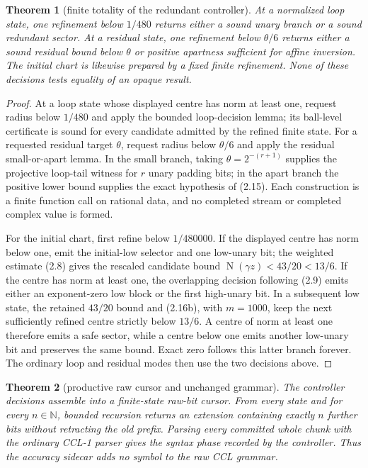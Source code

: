 \documentclass[10pt]{article}
\newtheorem{theorem}{Theorem}[section]
\theoremstyle{definition}
\theoremstyle{remark}
\newcommand{\N}{\mathbb{N}}
\newcommand{\Norm}{\operatorname{N}}
\begin{document}
\begin{theorem}[finite totality of the redundant controller]
At a normalized loop state, one refinement below $1/480$ returns either a
sound unary branch or a sound redundant sector.  At a residual state, one
refinement below $\theta/6$ returns either a sound residual bound below
$\theta$ or positive apartness sufficient for affine inversion.  The initial
chart is likewise prepared by a fixed finite refinement.  None of these
decisions tests equality of an opaque result.
\end{theorem}

\begin{proof}
At a loop state whose displayed centre has norm at least one, request radius
below $1/480$ and apply the bounded loop-decision lemma; its ball-level
certificate is sound for every candidate admitted by the refined finite
state.  For a requested residual target $\theta$, request radius below
$\theta/6$ and apply the residual small-or-apart lemma.  In the
small branch, taking $\theta=2^{-(r+1)}$ supplies the projective loop-tail
witness for $r$ unary padding bits; in the apart branch the positive lower
bound supplies the exact hypothesis of (2.15).  Each construction is a
finite function call on rational data, and no completed stream or completed
complex value is formed.

For the initial chart, first refine below $1/480000$.  If the displayed centre
has norm below one, emit the initial-low selector and one low-unary bit; the
weighted estimate (2.8) gives the rescaled candidate bound
$\Norm(\gamma z)<43/20<13/6$.  If the centre has norm at least one, the
overlapping decision following (2.9) emits either an exponent-zero low block
or the first high-unary bit.  In a subsequent low state, the retained
$43/20$ bound and (2.16b), with $m=1000$, keep the next sufficiently refined
centre strictly below $13/6$.  A centre of norm at least one therefore emits
a safe sector, while a centre below one emits another low-unary bit and
preserves the same bound.  Exact zero follows this latter branch forever.
The ordinary loop and residual modes then use the two decisions above.
\end{proof}

\begin{theorem}[productive raw cursor and unchanged grammar]
The controller decisions assemble into a finite-state raw-bit cursor.  From
every state and for every $n\in\N$, bounded recursion returns an extension
containing exactly $n$ further bits without retracting the old prefix.
Parsing every committed whole chunk with the ordinary CCL-1 parser gives the
syntax phase recorded by the controller.  Thus the accuracy sidecar adds no
symbol to the raw CCL grammar.
\end{theorem}
\end{document}
